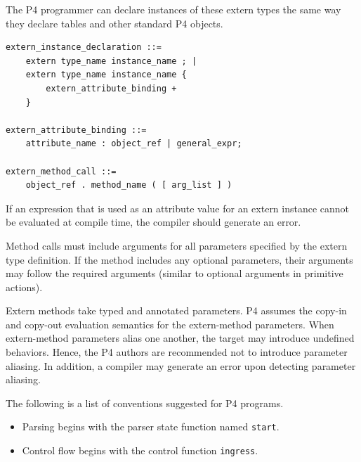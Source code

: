 \documentclass[12pt]{article}
\begin{document}

The P4 programmer can declare instances of these extern types the same way they
declare tables and other standard P4 objects.

\begin{lstlisting}[style=BNFstyle]
extern_instance_declaration ::= 
    extern type_name instance_name ; |
    extern type_name instance_name { 
        extern_attribute_binding +
    }

extern_attribute_binding ::=
    attribute_name : object_ref | general_expr;

extern_method_call ::= 
    object_ref . method_name ( [ arg_list ] )
\end{lstlisting}

If an expression that is used as an attribute value for an extern
instance cannot be evaluated at compile time, the compiler should
generate an error.

Method calls must include arguments for all parameters specified by the
extern type definition. If the method includes any optional parameters, their
arguments may follow the required arguments (similar to optional arguments
in primitive actions). 

Extern methods take typed and annotated parameters. P4 assumes the
copy-in and copy-out evaluation semantics for the extern-method parameters.
When extern-method parameters alias one another, the target may introduce
undefined behaviors. Hence, the P4 authors are recommended not to
introduce parameter aliasing. In addition, a compiler may generate
an error upon detecting parameter aliasing.



The following is a list of conventions suggested for P4 programs.

\begin{itemize}
\item
Parsing begins with the parser state function named \texttt{start}.
\item
Control flow begins with the control function \texttt{ingress}.
\end{itemize}

\end{document}
